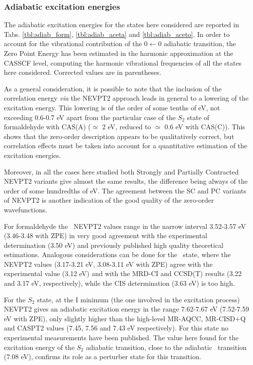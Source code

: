 \subsubsection*{Adiabatic excitation energies}
The adiabatic excitation energies 
for the states here considered are reported in Tabs. \ref{tbl:adiab_form},
\ref{tbl:adiab_aceta} and \ref{tbl:adiab_aceto}.  In order to account for
the vibrational contribution of the $0\leftarrow0$ adiabatic transition, the
Zero Point Energy has been estimated in the harmonic approximation at the
CASSCF level, computing the harmonic vibrational frequencies of all the
states here considered. Corrected values are in parentheses.



As a general consideration, it is possible to note that the inclusion of the
correlation energy {\it via} the NEVPT2 approach leads in general to a
lowering of the excitation energy.  This lowering is of the order of some
tenths of eV, not exceeding 0.6-0.7 eV apart from the particular case of the
$S_2$ state of formaldehyde with CAS(A) ($\simeq$ 2 eV, reduced to $\simeq$
0.6 eV with CAS(C)).  This shows that the zero-order description appears to
be qualitatively correct, but correlation effects must be taken into account
for a quantitative estimation of the excitation energies.

Moreover, in all the cases here studied both Strongly and Partially
Contracted NEVPT2 variants give almost the same results, the difference
being always of the order of some hundredths of eV.  The agreement between
the SC and PC variants of NEVPT2 is another indication of the good quality
of the zero-order wavefunctions. 

For formaldehyde the \snpi\ NEVPT2 values range in the narrow interval 
3.52-3.57 eV (3.46-3.48 with ZPE) in very good agreement with the
experimental determination (3.50 eV) and previously published high quality 
theoretical estimations. 
Analogous considerations can be done for the \tnpi\ state, where the NEVPT2
values (3.17-3.21 eV, 3.08-3.11 eV with ZPE) agree with the experimental
value (3.12 eV) and with the MRD-CI\cite{jpc-99-16576-1995} and
CCSD(T)\cite{jcp-108-5281-1998} results (3.22 and 3.17 eV, respectively),
while the CIS\cite{jpc-97-4293-1993} determination (3.63 eV) is too high.

For the $S_2$ state, at the I minimum (the one involved in the excitation
process) NEVPT2 gives an adiabatic excitation energy in the range 7.62-7.67
eV (7.52-7.59 eV with ZPE), only slightly higher than the high-level
MR-AQCC\cite{jcp-114-746-2001}, MR-CISD+Q\cite{jcp-114-746-2001} and CASPT2
values\cite{tca-92-227-1995} (7.45, 7.56 and 7.43 eV respectively).  For
this state no experimental measurements have been published.  The value here
found for the excitation energy of the $S_2$ adiabatic transition, close to
the adiabatic \snts\ transition\cite{jcsft-90-683-1994} (7.08 eV), confirms
its role as a perturber state for this transition.

